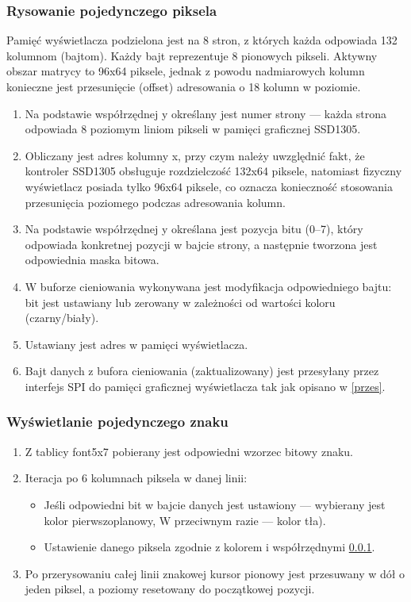 \subsubsection {Rysowanie pojedynczego piksela}
\label{piksel}
Pamięć wyświetlacza podzielona jest na 8 stron, z których każda odpowiada 132 kolumnom (bajtom). Każdy bajt reprezentuje 8 pionowych pikseli. Aktywny obszar matrycy to 96x64 piksele, jednak z powodu nadmiarowych kolumn konieczne jest przesunięcie (offset) adresowania o 18 kolumn w poziomie.

\begin{enumerate}
    \item Na podstawie współrzędnej y określany jest numer strony — każda strona odpowiada 8 poziomym liniom pikseli w pamięci graficznej SSD1305.
    \item Obliczany jest adres kolumny x, przy czym należy uwzględnić fakt, że kontroler SSD1305 obsługuje rozdzielczość 132x64 piksele, natomiast fizyczny wyświetlacz posiada tylko 96x64 piksele, co oznacza konieczność stosowania przesunięcia poziomego podczas adresowania kolumn.
    \item Na podstawie współrzędnej y określana jest pozycja bitu (0–7), który odpowiada konkretnej pozycji w bajcie strony, a następnie tworzona jest odpowiednia maska bitowa.
    \item W buforze cieniowania wykonywana jest modyfikacja odpowiedniego bajtu: bit jest ustawiany lub zerowany w zależności od wartości koloru (czarny/biały).
    \item Ustawiany jest adres w pamięci wyświetlacza.
    \item Bajt danych z bufora cieniowania (zaktualizowany) jest przesyłany przez interfejs SPI do pamięci graficznej wyświetlacza tak jak opisano w \ref{przes}.
\end{enumerate}

\subsubsection{Wyświetlanie pojedynczego znaku}
\begin{enumerate}
    \item Z tablicy font5x7 pobierany jest odpowiedni wzorzec bitowy znaku.
        \item Iteracja po 6 kolumnach piksela w danej linii:
        \begin{itemize}
            \item Jeśli odpowiedni bit w bajcie danych jest ustawiony — wybierany jest kolor pierwszoplanowy, W przeciwnym razie — kolor tła).
            \item Ustawienie danego piksela zgodnie z kolorem i współrzędnymi \ref{piksel}.
        \end{itemize}
    \item Po przerysowaniu całej linii znakowej kursor pionowy jest przesuwany w dół o jeden piksel, a poziomy resetowany do początkowej pozycji.
\end{enumerate}

